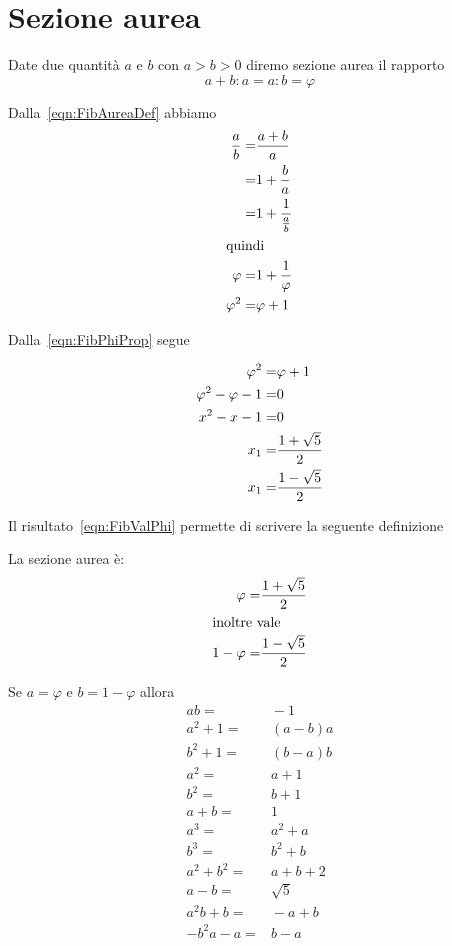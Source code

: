 \section{Sezione aurea}
\begin{defn}
	Date due quantità $a$ e $b$ con $a>b>0$ diremo sezione aurea il rapporto
	\begin{equation}
	a+b:a=a:b=\varphi	
	\end{equation}\label{eqn:FibAureaDef}
\end{defn}
\begin{prop}
	Dalla~\vref{eqn:FibAureaDef} abbiamo
	\begin{align}
		\dfrac{a}{b}=&{}\dfrac{a+b}{a}\notag\\
		=&{}1+\dfrac{b}{a}\notag\\
		=&{}1+\dfrac{1}{\frac{a}{b}}\notag\\
		\intertext{quindi}
		\varphi=&{}1+\dfrac{1}{\varphi}\label{eqn:FibPhiProp}\\
		\varphi^2=&{}\varphi+1\notag
	\end{align}
\end{prop}
	Dalla~\vref{eqn:FibPhiProp} segue
	\begin{prop}
	\begin{align}
		\varphi^2=&{}\varphi+1\notag\\
		\varphi^2-\varphi-1=&{}0\notag\\
		x^2-x-1=&{}0\label{eqn:FibValPhiEqua}\\
		x_1=&{}\dfrac{1+\sqrt{5}}{2}\label{eqn:FibValPhi}\\
		x_1=&{}\dfrac{1-\sqrt{5}}{2}\notag
	\end{align}
\end{prop}
Il risultato~\ref{eqn:FibValPhi} permette di scrivere la seguente definizione
\begin{defn}
La sezione aurea è: 
\begin{align*}
	\varphi=&{}\dfrac{1+\sqrt{5}}{2}\\
\intertext{inoltre vale}
	1-	\varphi=&{}\dfrac{1-\sqrt{5}}{2}\\
\end{align*}
\end{defn}
\begin{lem}[Proprietà]\label{lem:FibpropPhi}
	Se $a=\varphi$ e  $b=1-\varphi$ allora
	\begin{align*}
		ab=&{}-1\\
		a^2+1=&{}(a-b)a\\
		b^2+1=&{}(b-a)b\\
		a^2=&{}a+1\\
		b^2=&{}b+1\\
		a+b=&{}1\\
		a^3=&{}a^2+a\\
		b^3=&{}b^2+b\\
		a^2+b^2=&{}a+b+2\\
	a-b=&{}\sqrt{5}\\
	a^2b+b=&{}-a+b\\
	-b^2a-a=&{}b-a\\
		\end{align*}
\end{lem}
